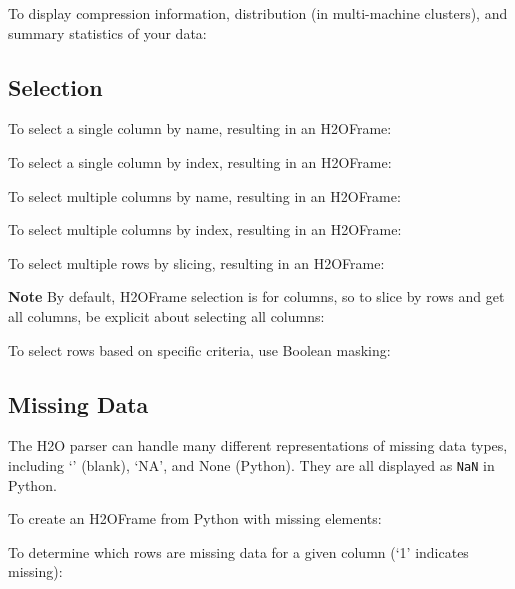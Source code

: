 {To display compression information, distribution (in multi-machine clusters), and summary statistics of your data:





\subsection{Selection}
To select a single column by name, resulting in an H2OFrame:


To select a single column by index, resulting in an H2OFrame:


\newpage
To select multiple columns by name, resulting in an H2OFrame:


To select multiple columns by index, resulting in an H2OFrame:


\newpage
To select multiple rows by slicing, resulting in an H2OFrame: 

\textbf{Note} By default, H2OFrame selection is for columns, so to slice by rows
and get all columns, be explicit about selecting all columns:


To select rows based on specific criteria, use Boolean masking:



\subsection{Missing Data}
The H2O parser can handle many different representations of missing data types, including `' (blank),
`NA',  and None (Python).  They are all displayed as \texttt{NaN} in Python.

To create an H2OFrame from Python with missing elements:


To determine which rows are missing data for a given column (`1' indicates missing):


}
